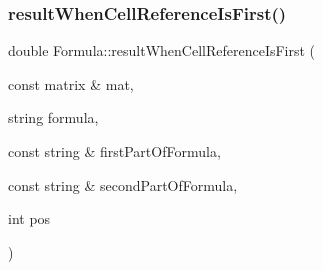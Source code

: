 \subsubsection{\texorpdfstring{result\+When\+Cell\+Reference\+Is\+First()}{resultWhenCellReferenceIsFirst()}}
{\footnotesize\ttfamily double Formula\+::result\+When\+Cell\+Reference\+Is\+First (\begin{DoxyParamCaption}\item[{const matrix \&}]{mat,  }\item[{string}]{formula,  }\item[{const string \&}]{first\+Part\+Of\+Formula,  }\item[{const string \&}]{second\+Part\+Of\+Formula,  }\item[{int}]{pos }\end{DoxyParamCaption})\hspace{0.3cm}{\ttfamily [private]}}

